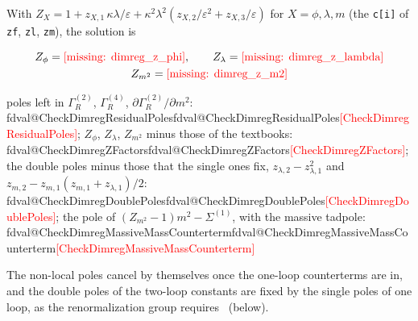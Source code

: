 \documentclass[11pt,a4paper]{article}
\makeatletter
\newcommand{\formula}[1]{\IfFileExists{figures/formula_#1.tex}{}{\text{\textcolor{red}{[missing: \detokenize{#1}]}}}}
\newcommand{\pkg}[1]{\texttt{#1}}
\newcommand{\val}[1]{\ifcsname fdval@#1\endcsname\csname fdval@#1\endcsname\else\textcolor{red}{[#1]}\fi}
\makeatother
\begin{document}
With $Z_X=1+z_{X,1}\,\kappa\lambda/\varepsilon+\kappa^2\lambda^2(z_{X,2}/\varepsilon^2+z_{X,3}/\varepsilon)$ for
$X=\phi,\lambda,m$ (the \pkg{c[i]} of \pkg{zf}, \pkg{zl}, \pkg{zm}), the solution is
\begin{outputbox}
\vspace{-6pt}
\begin{gather*}
Z_\phi=\formula{dimreg_z_phi},\qquad Z_\lambda=\formula{dimreg_z_lambda}\\
Z_{m^2}=\formula{dimreg_z_m2}
\end{gather*}
\end{outputbox}
\begin{result}
poles left in $\Gamma^{(2)}_R$, $\Gamma^{(4)}_R$, $\partial\Gamma^{(2)}_R/\partial m^2$: \val{CheckDimregResidualPoles}; $Z_\phi$,
$Z_\lambda$, $Z_{m^2}$ minus those of the textbooks: \val{CheckDimregZFactors}; the double poles minus those that the single
ones fix, $z_{\lambda,2}-z_{\lambda,1}^2$ and $z_{m,2}-z_{m,1}(z_{m,1}+z_{\lambda,1})/2$: \val{CheckDimregDoublePoles}; the pole of
$(Z_{m^2}-1)m^2-\Sigma^{(1)}$, with the massive tadpole: \val{CheckDimregMassiveMassCounterterm}
\end{result}
The non-local poles cancel by themselves once the one-loop counterterms are in, and the double poles of the two-loop
constants are fixed by the single poles of one loop, as the renormalization group requires~\cite{tHooft1973} (below).
\end{document}
